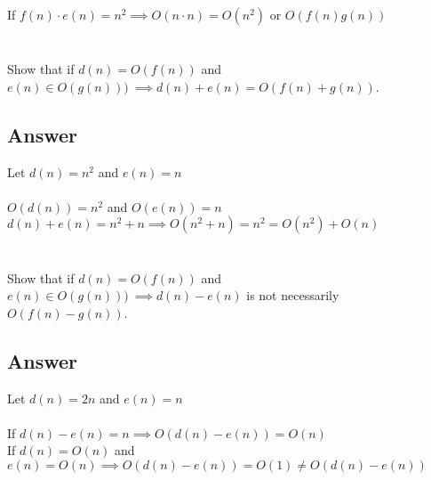 \documentclass{article}
\begin{document}
\begin{mdframed}

  If \(f(n) \cdot e(n) = n^2 \implies O(n \cdot n) = O(n^2)\) or \(O(f(n)g(n))\)

\end{mdframed}


\section{}

Show that if \(d(n) = O(f(n))\) and \(e(n) \in O(g(n)))\ \implies d(n) + e(n) = O(f(n) + g(n))\).

\subsection{Answer}

\begin{mdframed}
  Let \(d(n) = n^2\) and \(e(n) = n\) \\ \\
  \(O(d(n)) = n^2\) and \(O(e(n)) = n\)
  \(d(n) + e(n) = n^2 + n \implies O(n^2 + n) = n^2 = O(n^2) + O(n)\)

\end{mdframed}


\section{}

Show that if \(d(n) = O(f(n))\) and \(e(n) \in O(g(n)))\ \implies d(n) - e(n)\)
is not necessarily \(  O(f(n) - g(n))\).

\subsection{Answer}

\begin{mdframed}
  Let \(d(n) = 2n\) and \(e(n) = n\) \\ \\
  If \(d(n) - e(n) = n \implies O(d(n) - e(n)) = O(n) \) \\ 
  If \(d(n) = O(n) \) and \(e(n) = O(n) \implies O(d(n) - e(n)) = O(1) \neq O(d(n) - e(n))\)

\end{mdframed}


\section{}
\end{document}
